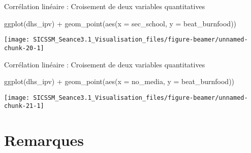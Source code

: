 \documentclass[
  ignorenonframetext,
]{beamer}
\newenvironment{Shaded}{\begin{snugshade}}{\end{snugshade}}
\newcommand{\AttributeTok}[1]{\textcolor[rgb]{0.77,0.63,0.00}{#1}}
\newcommand{\FunctionTok}[1]{\textcolor[rgb]{0.00,0.00,0.00}{#1}}
\newcommand{\NormalTok}[1]{#1}
\newcommand{\SpecialCharTok}[1]{\textcolor[rgb]{0.00,0.00,0.00}{#1}}
\begin{document}
\begin{frame}[fragile]{Corrélation linéaire : Croisement de deux
variables quantitatives}
\protect\hypertarget{corruxe9lation-linuxe9aire-croisement-de-deux-variables-quantitatives}{}
\begin{Shaded}
\begin{Highlighting}[]
\FunctionTok{ggplot}\NormalTok{(dhs\_ipv) }\SpecialCharTok{+}
  \FunctionTok{geom\_point}\NormalTok{(}\FunctionTok{aes}\NormalTok{(}\AttributeTok{x =}\NormalTok{ sec\_school, }\AttributeTok{y =}\NormalTok{ beat\_burnfood)) }
\end{Highlighting}
\end{Shaded}

\begin{center}\texttt{[image: SICSSM\_Seance3.1\_Visualisation\_files/figure-beamer/unnamed-chunk-20-1]} \end{center}
\end{frame}

\begin{frame}[fragile]{Corrélation linéaire : Croisement de deux
variables quantitatives}
\protect\hypertarget{corruxe9lation-linuxe9aire-croisement-de-deux-variables-quantitatives-1}{}
\begin{Shaded}
\begin{Highlighting}[]
\FunctionTok{ggplot}\NormalTok{(dhs\_ipv) }\SpecialCharTok{+}
  \FunctionTok{geom\_point}\NormalTok{(}\FunctionTok{aes}\NormalTok{(}\AttributeTok{x =}\NormalTok{ no\_media, }\AttributeTok{y =}\NormalTok{ beat\_burnfood)) }
\end{Highlighting}
\end{Shaded}

\begin{center}\texttt{[image: SICSSM\_Seance3.1\_Visualisation\_files/figure-beamer/unnamed-chunk-21-1]} \end{center}
\end{frame}

\hypertarget{remarques}{%
\section{Remarques}\label{remarques}}
\end{document}
